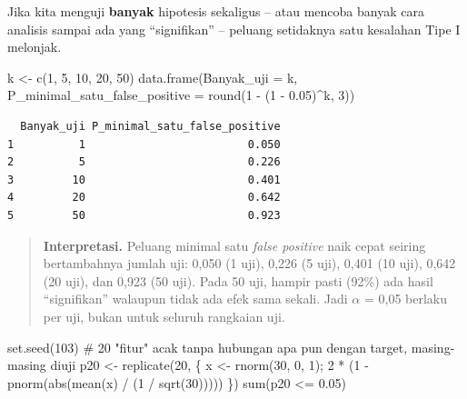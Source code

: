 \documentclass[
  indonesian,
  letterpaper,
]{book}
\newenvironment{Shaded}{\begin{snugshade}}{\end{snugshade}}
\newcommand{\AttributeTok}[1]{\textcolor[rgb]{0.40,0.45,0.13}{#1}}
\newcommand{\CommentTok}[1]{\textcolor[rgb]{0.37,0.37,0.37}{#1}}
\newcommand{\DecValTok}[1]{\textcolor[rgb]{0.68,0.00,0.00}{#1}}
\newcommand{\FloatTok}[1]{\textcolor[rgb]{0.68,0.00,0.00}{#1}}
\newcommand{\FunctionTok}[1]{\textcolor[rgb]{0.28,0.35,0.67}{#1}}
\newcommand{\NormalTok}[1]{\textcolor[rgb]{0.00,0.23,0.31}{#1}}
\newcommand{\OtherTok}[1]{\textcolor[rgb]{0.00,0.23,0.31}{#1}}
\newcommand{\SpecialCharTok}[1]{\textcolor[rgb]{0.37,0.37,0.37}{#1}}
\begin{document}
Jika kita menguji \textbf{banyak} hipotesis sekaligus -- atau mencoba
banyak cara analisis sampai ada yang ``signifikan'' -- peluang
setidaknya satu kesalahan Tipe I melonjak.

\begin{Shaded}
\begin{Highlighting}[]
\NormalTok{k }\OtherTok{\textless{}{-}} \FunctionTok{c}\NormalTok{(}\DecValTok{1}\NormalTok{, }\DecValTok{5}\NormalTok{, }\DecValTok{10}\NormalTok{, }\DecValTok{20}\NormalTok{, }\DecValTok{50}\NormalTok{)}
\FunctionTok{data.frame}\NormalTok{(}\AttributeTok{Banyak\_uji =}\NormalTok{ k, }\AttributeTok{P\_minimal\_satu\_false\_positive =} \FunctionTok{round}\NormalTok{(}\DecValTok{1} \SpecialCharTok{{-}}\NormalTok{ (}\DecValTok{1} \SpecialCharTok{{-}} \FloatTok{0.05}\NormalTok{)}\SpecialCharTok{\^{}}\NormalTok{k, }\DecValTok{3}\NormalTok{))}
\end{Highlighting}
\end{Shaded}

\begin{verbatim}
  Banyak_uji P_minimal_satu_false_positive
1          1                         0.050
2          5                         0.226
3         10                         0.401
4         20                         0.642
5         50                         0.923
\end{verbatim}

\begin{quote}
\textbf{Interpretasi.} Peluang minimal satu \emph{false positive} naik
cepat seiring bertambahnya jumlah uji: 0,050 (1 uji), 0,226 (5 uji),
0,401 (10 uji), 0,642 (20 uji), dan 0,923 (50 uji). Pada 50 uji, hampir
pasti (92\%) ada hasil ``signifikan'' walaupun tidak ada efek sama
sekali. Jadi \(\alpha\) = 0,05 berlaku per uji, bukan untuk seluruh
rangkaian uji.
\end{quote}

\begin{Shaded}
\begin{Highlighting}[]
\FunctionTok{set.seed}\NormalTok{(}\DecValTok{103}\NormalTok{)}
\CommentTok{\# 20 "fitur" acak tanpa hubungan apa pun dengan target, masing{-}masing diuji}
\NormalTok{p20 }\OtherTok{\textless{}{-}} \FunctionTok{replicate}\NormalTok{(}\DecValTok{20}\NormalTok{, \{ x }\OtherTok{\textless{}{-}} \FunctionTok{rnorm}\NormalTok{(}\DecValTok{30}\NormalTok{, }\DecValTok{0}\NormalTok{, }\DecValTok{1}\NormalTok{); }\DecValTok{2} \SpecialCharTok{*}\NormalTok{ (}\DecValTok{1} \SpecialCharTok{{-}} \FunctionTok{pnorm}\NormalTok{(}\FunctionTok{abs}\NormalTok{(}\FunctionTok{mean}\NormalTok{(x) }\SpecialCharTok{/}\NormalTok{ (}\DecValTok{1} \SpecialCharTok{/} \FunctionTok{sqrt}\NormalTok{(}\DecValTok{30}\NormalTok{))))) \})}
\FunctionTok{sum}\NormalTok{(p20 }\SpecialCharTok{\textless{}=} \FloatTok{0.05}\NormalTok{)}
\end{Highlighting}
\end{Shaded}
\end{document}
